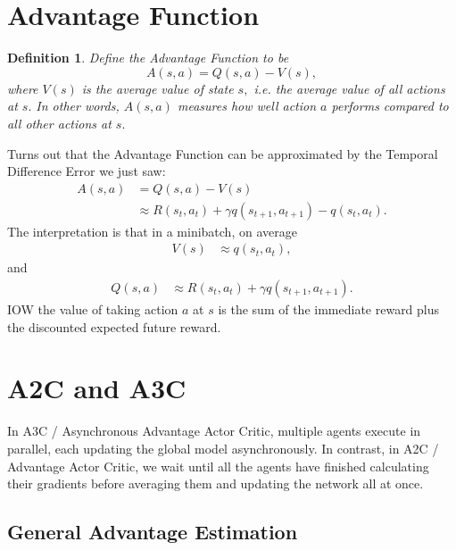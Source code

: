 \documentclass[20pt]{extarticle}
\theoremstyle{plain}
\newtheorem{definition}[theorem]{Definition}
\theoremstyle{definition}
\theoremstyle{remark}
\newcommand{\0}{\varnothing}
\newcommand{\g}{\gamma}
\newcommand{\<}{\langle}
\renewcommand{\>}{\rangle}
\begin{document}
\section{Advantage Function}

\begin{definition}
Define the Advantage Function to be \[
A(s, a) = Q(s, a) - V(s),
\]
where $ V(s) $ is the average value of state $ s, $ i.e. the average value of all actions at $ s. $ In other words, $ A(s, a) $ measures how well action $ a $ performs compared to all other actions at $ s. $
\end{definition}

Turns out that the Advantage Function can be approximated by the Temporal Difference Error we just saw: \begin{align*}
    A(s, a) &= Q(s, a) - V(s) \\
    &\approx R(s_t, a_t) + \g q(s_{t+1}, a_{t+1}) - q(s_t, a_t).
\end{align*}
The interpretation is that in a minibatch, on average \begin{align*}
    V(s) &\approx q(s_t, a_t),
\end{align*}
and
\begin{align*}
    Q(s, a) &\approx R(s_t, a_t) + \g q(s_{t+1}, a_{t+1}).
\end{align*}
IOW the value of taking action $ a $ at $ s $ is the sum of the immediate reward plus the discounted expected future reward.

\section{A2C and A3C}

In A3C / Asynchronous Advantage Actor Critic, multiple agents execute in parallel, each updating the global model asynchronously. In contrast, in A2C / Advantage Actor Critic, we wait until all the agents have finished calculating their gradients before averaging them and updating the network all at once.

\subsection*{General Advantage Estimation}
\end{document}
